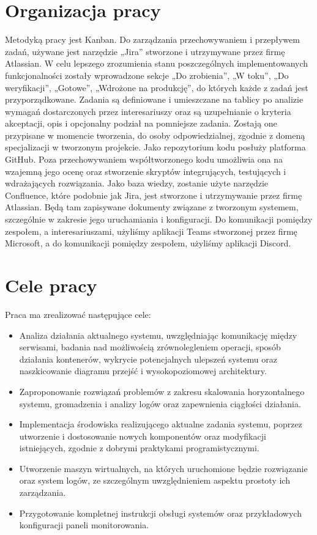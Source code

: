 \section{Organizacja pracy}
\indent Metodyką pracy jest Kanban. Do zarządzania przechowywaniem i przepływem zadań, używane jest narzędzie „Jira” stworzone i utrzymywane przez firmę Atlassian. W celu lepszego zrozumienia stanu poszczególnych implementowanych funkcjonalności zostały wprowadzone sekcje „Do zrobienia”, „W toku”, „Do weryfikacji”, „Gotowe”, „Wdrożone na produkcję”, do których każde z zadań jest przyporządkowane. Zadania są definiowane i umieszczane na tablicy po analizie wymagań dostarczonych przez interesariuszy oraz są uzupełnianie o kryteria akceptacji, opis i opcjonalny podział na pomniejsze zadania. Zostają one przypisane w momencie tworzenia, do osoby odpowiedzialnej, zgodnie z domeną specjalizacji w tworzonym projekcie.
\newline \indent Jako repozytorium kodu posłuży platforma GitHub. Poza przechowywaniem współtworzonego kodu umożliwia ona na wzajemną jego ocenę oraz stworzenie skryptów integrujących, testujących i wdrażających rozwiązania.
\newline \indent Jako baza wiedzy, zostanie użyte narzędzie Confluence, które podobnie jak Jira, jest stworzone i utrzymywanie przez firmę Atlassian. Będą tam zapisywane dokumenty związane z tworzonym systemem, szczególnie w zakresie jego uruchamiania i konfiguracji.
\newline \indent Do komunikacji pomiędzy zespołem, a interesariuszami, użyliśmy aplikacji Teams stworzonej przez firmę Microsoft, a do komunikacji pomiędzy zespołem, użyliśmy aplikacji Discord.

\section{Cele pracy}
\indent Praca ma zrealizować następujące cele:
\begin{itemize}
    \item Analiza działania aktualnego systemu, uwzględniając komunikację między serwisami, badania nad możliwością zrównolegleniem operacji, sposób działania kontenerów, wykrycie potencjalnych ulepszeń systemu oraz naszkicowanie diagramu przejść i wysokopoziomowej architektury.
    \item Zaproponowanie rozwiązań problemów z zakresu skalowania horyzontalnego systemu, gromadzenia i analizy logów oraz zapewnienia ciągłości działania.
    \item Implementacja środowiska realizującego aktualne zadania systemu, poprzez utworzenie i dostosowanie nowych komponentów oraz modyfikacji istniejących, zgodnie z dobrymi praktykami programistycznymi.
    \item Utworzenie maszyn wirtualnych, na których uruchomione będzie rozwiązanie oraz system logów, ze szczególnym uwzględnieniem aspektu prostoty ich zarządzania.
    \item Przygotowanie kompletnej instrukcji obsługi systemów oraz przykładowych konfiguracji paneli monitorowania.
\end{itemize}
